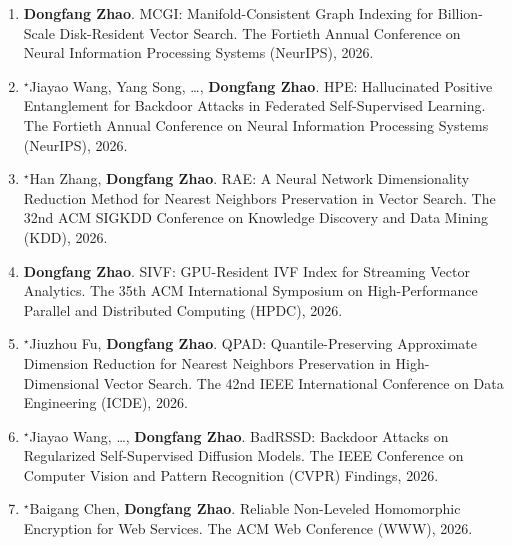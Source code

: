 \documentclass[11pt]{scrartcl}
\begin{document}



\begin{enumerate}
  \leftskip-0.13in %

\item \textbf{Dongfang Zhao}.
MCGI: Manifold-Consistent Graph Indexing for Billion-Scale Disk-Resident Vector Search. 
The Fortieth Annual Conference on Neural Information Processing Systems (NeurIPS), 2026.  

\item $^\star$Jiayao Wang, Yang Song, \dots, \textbf{Dongfang Zhao}.
HPE: Hallucinated Positive Entanglement for Backdoor Attacks in Federated Self-Supervised Learning. 
The Fortieth Annual Conference on Neural Information Processing Systems (NeurIPS), 2026.

\item $^\star$Han Zhang, \textbf{Dongfang Zhao}.
RAE: A Neural Network Dimensionality Reduction Method for Nearest Neighbors Preservation in Vector Search. 
The 32nd ACM SIGKDD Conference on Knowledge Discovery and Data Mining (KDD), 2026.    

\item \textbf{Dongfang Zhao}.
SIVF: GPU-Resident IVF Index for Streaming Vector Analytics. 
The 35th ACM International Symposium on High-Performance Parallel and Distributed Computing (HPDC), 2026. 

\item $^\star$Jiuzhou Fu, \textbf{Dongfang Zhao}.
QPAD: Quantile-Preserving Approximate Dimension Reduction for Nearest Neighbors Preservation in High-Dimensional Vector Search. 
The 42nd IEEE International Conference on Data Engineering (ICDE), 2026.  

\item 	$^\star$Jiayao Wang, \dots, \textbf{Dongfang Zhao}.
BadRSSD: Backdoor Attacks on Regularized Self-Supervised Diffusion Models. 
The IEEE Conference on Computer Vision and Pattern Recognition (CVPR) Findings, 2026.

\item 	$^\star$Baigang Chen, \textbf{Dongfang Zhao}.
Reliable Non-Leveled Homomorphic Encryption for Web Services.
The ACM Web Conference (WWW), 2026.  


\end{enumerate}
\end{document}
